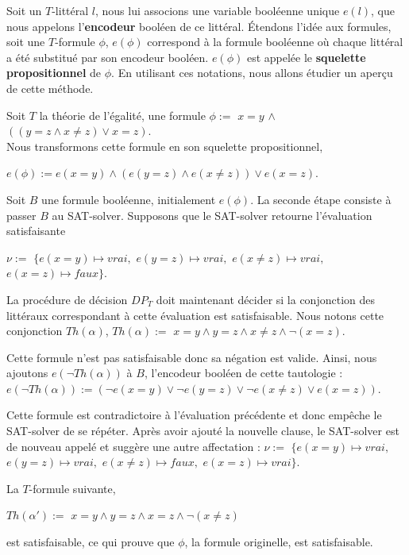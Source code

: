 \documentclass[11pt,openany]{article}
\begin{document}
	 		Soit un $T$-litt\'eral $l$, nous lui associons une variable bool\'eenne unique $e(l)$, que nous appelons l'\textbf{encodeur} bool\'een de ce litt\'eral. \'Etendons l'id\'ee aux formules, soit une $T$-formule $\phi$, $e(\phi)$ correspond \`a la formule bool\'eenne o\`u chaque litt\'eral a \'et\'e substitu\'e par son encodeur bool\'een. $e(\phi)$ est appel\'ee le \textbf{squelette propositionnel} de $\phi$. En utilisant ces notations, nous allons \'etudier un aper\c{c}u de cette m\'ethode.
	 		
	 		Soit $T$ la th\'eorie de l'\'egalit\'e, une formule	$\phi :=$ $x=y$ $\land$ $((y=z\land x\neq z)\lor x=z)$.\\
	 		Nous transformons cette formule en son squelette propositionnel,
	 		
	 		 $e(\phi):= e(x=y)\land (e(y=z)\land e(x\neq z))\lor e(x=z)$.
	 		 
Soit $B$ une formule bool\'eenne, initialement $e(\phi)$. La seconde \'etape consiste \`a passer $B$ au SAT-solver. Supposons que le SAT-solver retourne l'\'evaluation satisfaisante\par
$\nu:=$ $\{e(x=y)\mapsto vrai, $ $e(y=z)\mapsto vrai,$ $e(x\neq z)\mapsto vrai,$ $e(x=z)\mapsto faux\}$.

La proc\'edure de d\'ecision $DP_{T}$ doit maintenant d\'ecider si la conjonction des litt\'eraux correspondant \`a cette \'evaluation est satisfaisable. Nous notons cette conjonction $Th(\alpha)$, $Th(\alpha):=$ $x=y\land y=z\land x\neq z\land \neg(x=z)$.
 
	Cette formule n'est pas satisfaisable donc sa n\'egation est valide. Ainsi, nous ajoutons $e(\neg Th(\alpha))$ \`a $B$, l'encodeur bool\'een de cette tautologie :
 $e(\neg Th(\alpha)) := (\neg e(x=y)\lor\neg e(y=z)\lor\neg e(x\neq z)\lor e(x=z))$.
 
Cette formule est contradictoire \`a l'\'evaluation pr\'ec\'edente et donc emp\^eche le SAT-solver de se r\'ep\'eter. Apr\`es avoir ajout\'e la nouvelle clause, le SAT-solver est de nouveau appel\'e et sugg\`ere une autre affectation :
$\nu:=$ $\{e(x=y)\mapsto vrai, $ $e(y=z)\mapsto vrai,$ $e(x\neq z)\mapsto faux,$ $e(x=z)\mapsto vrai\}$.

La $T$-formule suivante,

 $Th(\alpha ' ):=$ $x=y\land y=z\land x=z\land \neg(x\neq z)$
 
est satisfaisable, ce qui prouve que $\phi$, la formule originelle, est satisfaisable.


\end{document}

